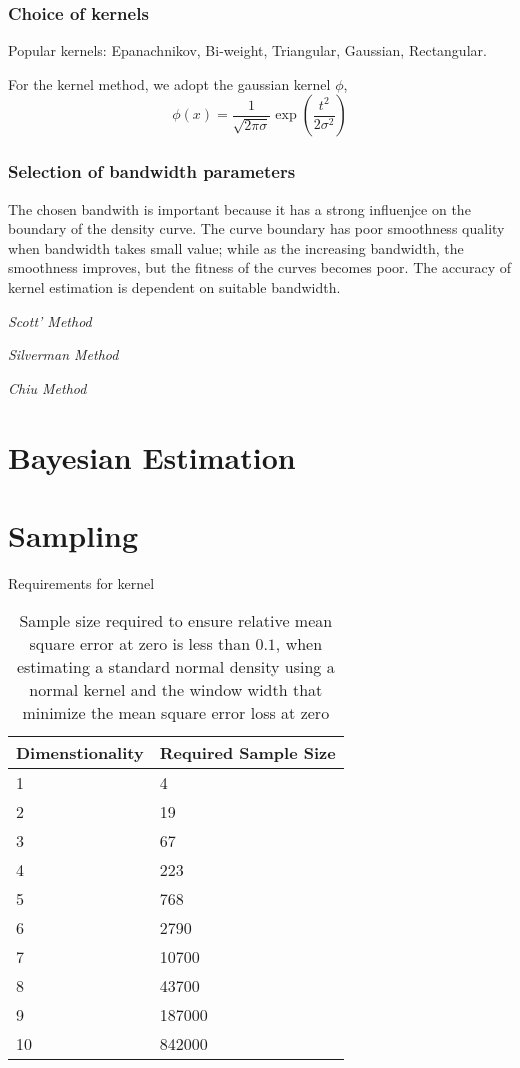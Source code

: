 \subsubsection{Choice of kernels}
Popular kernels: Epanachnikov, Bi-weight, Triangular, Gaussian, Rectangular.

For the kernel method, we adopt the gaussian kernel $\phi$,
\begin{equation}
  \phi(x)=\frac{1}{\sqrt{2\pi\sigma}}\exp{\left(\frac{t^2}{2\sigma^2}\right)}
\end{equation}
\subsubsection{Selection of bandwidth parameters}
The chosen bandwith is important because it has a strong influenjce on the boundary of the density curve.  The curve boundary has poor smoothness quality when bandwidth takes small value; while as the increasing bandwidth, the smoothness improves, but the fitness of the curves becomes poor.  The accuracy of kernel estimation is dependent on suitable bandwidth.

\emph{Scott' Method}

\emph{Silverman Method}

\emph{Chiu Method}
\section{Bayesian Estimation}

\section{Sampling}

Requirements for kernel
\begin{table}[htbp]
   \caption{Sample size required to ensure relative mean square error at zero is
       less than $0.1$, when estimating a standard normal density using a normal
       kernel and the window width that minimize the mean square error loss at
       zero\cite{silverman1986_density_estimation}}
   \label{tab:kde_sample_req}
   \begin{tabularx}{6.5in}{XX}
     \hline
     Dimenstionality & Required Sample Size \\
     \hline
     1 & 4 \\
     2 & 19 \\
     3 & 67 \\
     4 & 223 \\
     5 & 768 \\
     6 & 2790 \\
     7 & 10700 \\
     8 & 43700 \\
     9 & 187000 \\
     10 & 842000 \\
     \hline
   \end{tabularx}
\end{table}

